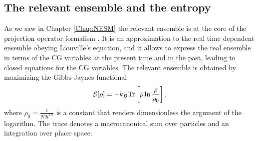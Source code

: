 \documentclass[b5paper,openright,10pt]{book}
\begin{document}
\begin{appendices}
\section{The relevant ensemble and the entropy}
As we saw in Chapter \ref{Chap:NESM}
the  relevant ensemble  is  at  the core  of  the projection  operator
formalism \cite{Grabert1982}. It is an  approximation to the real time
dependent  ensemble obeying  Liouville's  equation, and  it allows  to
express the real ensemble in terms  of the CG variables at the present
time and in the past, leading to closed equations for the CG variables.
The  relevant  ensemble is  obtained  by  maximizing the  Gibbs-Jaynes
functional
\begin{align}
  {\cal S}[\rho]=-k_B{\rm Tr}\left[\rho\ln\frac{\rho}{\rho_0}\right],
\end{align}
where   $\rho_0=\frac{1}{N!h^{3N}}$  is   a   constant  that   renders
dimensionless the argument of the  logarithm. The trace denotes
a macrocanonical sum over particles and an integration over phase space.


\end{appendices}
\end{document}
